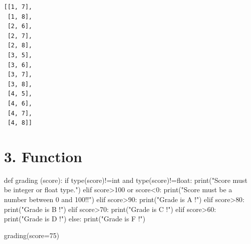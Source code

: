 \documentclass[
  letterpaper,
  DIV=11,
  numbers=noendperiod]{scrreprt}
\newenvironment{Shaded}{\begin{snugshade}}{\end{snugshade}}
\newcommand{\BuiltInTok}[1]{\textcolor[rgb]{0.00,0.23,0.31}{#1}}
\newcommand{\ControlFlowTok}[1]{\textcolor[rgb]{0.00,0.23,0.31}{#1}}
\newcommand{\DecValTok}[1]{\textcolor[rgb]{0.68,0.00,0.00}{#1}}
\newcommand{\KeywordTok}[1]{\textcolor[rgb]{0.00,0.23,0.31}{#1}}
\newcommand{\NormalTok}[1]{\textcolor[rgb]{0.00,0.23,0.31}{#1}}
\newcommand{\OperatorTok}[1]{\textcolor[rgb]{0.37,0.37,0.37}{#1}}
\newcommand{\StringTok}[1]{\textcolor[rgb]{0.13,0.47,0.30}{#1}}
\begin{document}
\begin{verbatim}
[[1, 7],
 [1, 8],
 [2, 6],
 [2, 7],
 [2, 8],
 [3, 5],
 [3, 6],
 [3, 7],
 [3, 8],
 [4, 5],
 [4, 6],
 [4, 7],
 [4, 8]]
\end{verbatim}

\section*{3. Function}\label{function}


\begin{Shaded}
\begin{Highlighting}[]
\KeywordTok{def}\NormalTok{ grading (score):}
    \ControlFlowTok{if} \BuiltInTok{type}\NormalTok{(score)}\OperatorTok{!=}\BuiltInTok{int} \KeywordTok{and} \BuiltInTok{type}\NormalTok{(score)}\OperatorTok{!=}\BuiltInTok{float}\NormalTok{:}
        \BuiltInTok{print}\NormalTok{(}\StringTok{"Score must be integer or float type."}\NormalTok{)}
    \ControlFlowTok{elif}\NormalTok{ score}\OperatorTok{\textgreater{}}\DecValTok{100} \KeywordTok{or}\NormalTok{ score}\OperatorTok{\textless{}}\DecValTok{0}\NormalTok{:}
        \BuiltInTok{print}\NormalTok{(}\StringTok{"Score must be a number between 0 and 100!!"}\NormalTok{)}
    \ControlFlowTok{elif}\NormalTok{ score}\OperatorTok{\textgreater{}}\DecValTok{90}\NormalTok{:}
        \BuiltInTok{print}\NormalTok{(}\StringTok{"Grade is A !"}\NormalTok{)}
    \ControlFlowTok{elif}\NormalTok{ score}\OperatorTok{\textgreater{}}\DecValTok{80}\NormalTok{:}
        \BuiltInTok{print}\NormalTok{(}\StringTok{"Grade is B !"}\NormalTok{)}
    \ControlFlowTok{elif}\NormalTok{ score}\OperatorTok{\textgreater{}}\DecValTok{70}\NormalTok{:}
        \BuiltInTok{print}\NormalTok{(}\StringTok{"Grade is C !"}\NormalTok{)}
    \ControlFlowTok{elif}\NormalTok{ score}\OperatorTok{\textgreater{}}\DecValTok{60}\NormalTok{:}
        \BuiltInTok{print}\NormalTok{(}\StringTok{"Grade is D !"}\NormalTok{)}
    \ControlFlowTok{else}\NormalTok{:}
        \BuiltInTok{print}\NormalTok{(}\StringTok{"Grade is F !"}\NormalTok{)}
\end{Highlighting}
\end{Shaded}

\begin{Shaded}
\begin{Highlighting}[]
\NormalTok{grading(score}\OperatorTok{=}\DecValTok{75}\NormalTok{)}
\end{Highlighting}
\end{Shaded}
\end{document}
